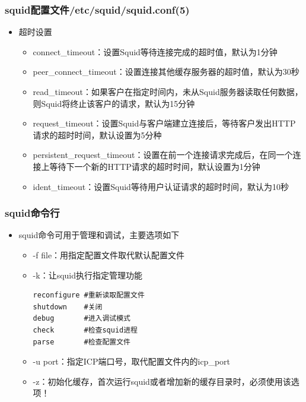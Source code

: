 \documentclass[xcolor=svgnames,presentation]{beamer}
\begin{document}
\begin{frame}
\frametitle{squid配置文件/etc/squid/squid.conf(5)}
\label{sec-4-6}
\begin{itemize}

\item 超时设置
\label{sec-4-6-1}%
\begin{itemize}

\item connect\_timeout：设置Squid等待连接完成的超时值，默认为1分钟
\label{sec-4-6-1-1}%

\item peer\_connect\_timeout：设置连接其他缓存服务器的超时值，默认为30秒
\label{sec-4-6-1-2}%

\item read\_timeout：如果客户在指定时间内，未从Squid服务器读取任何数据，则Squid将终止该客户的请求，默认为15分钟
\label{sec-4-6-1-3}%

\item request\_timeout：设置Squid与客户端建立连接后，等待客户发出HTTP请求的超时时间，默认设置为5分种
\label{sec-4-6-1-4}%

\item persistent\_request\_timeout：设置在前一个连接请求完成后，在同一个连接上等待下一个新的HTTP请求的超时时间，默认设置为1分钟
\label{sec-4-6-1-5}%

\item ident\_timeout：设置Squid等待用户认证请求的超时时间，默认为10秒
\label{sec-4-6-1-6}%
\end{itemize} %
\end{itemize} %
\end{frame}
\begin{frame}[fragile]
\frametitle{squid命令行}
\label{sec-4-7}
\begin{itemize}

\item squid命令可用于管理和调试，主要选项如下
\label{sec-4-7-1}%
\begin{itemize}

\item -f file：用指定配置文件取代默认配置文件
\label{sec-4-7-1-1}%

\item -k：让squid执行指定管理功能\\
\label{sec-4-7-1-2}%
\begin{verbatim}
reconfigure #重新读取配置文件
shutdown    #关闭
debug       #进入调试模式
check       #检查squid进程
parse       #检查配置文件
\end{verbatim}

\item -u port：指定ICP端口号，取代配置文件内的icp\_port
\label{sec-4-7-1-3}%

\item -z：初始化缓存，首次运行squid或者增加新的缓存目录时，必须使用该选项！
\label{sec-4-7-1-4}%
\end{itemize} %
\end{itemize} %
\end{frame}
\end{document}
